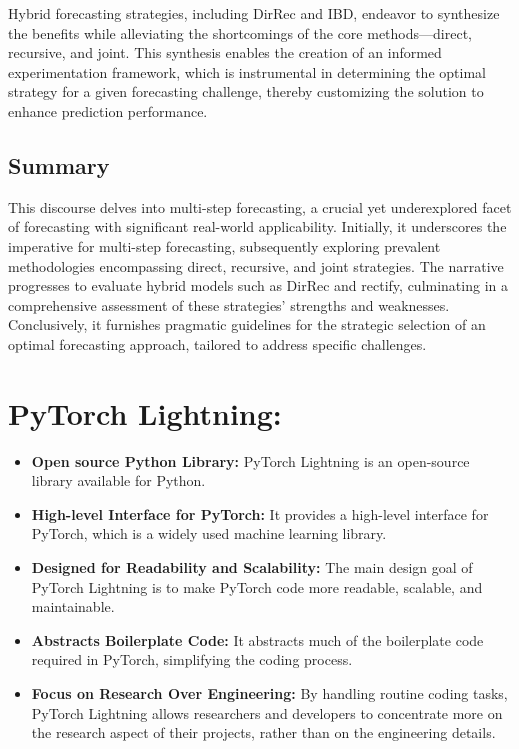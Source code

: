 \documentclass{article}
\begin{document}
Hybrid forecasting strategies, including DirRec and IBD, endeavor to synthesize the benefits while alleviating the shortcomings of the core methods—direct, recursive, and joint. This synthesis enables the creation of an informed experimentation framework, which is instrumental in determining the optimal strategy for a given forecasting challenge, thereby customizing the solution to enhance prediction performance.


\subsection{Summary}
This discourse delves into multi-step forecasting, a crucial yet underexplored facet of forecasting with significant real-world applicability. Initially, it underscores the imperative for multi-step forecasting, subsequently exploring prevalent methodologies encompassing direct, recursive, and joint strategies. The narrative progresses to evaluate hybrid models such as DirRec and rectify, culminating in a comprehensive assessment of these strategies' strengths and weaknesses. Conclusively, it furnishes pragmatic guidelines for the strategic selection of an optimal forecasting approach, tailored to address specific challenges.

\section{PyTorch Lightning:}
\begin{itemize}[label={--}]
    \item \textbf{Open source Python Library:} PyTorch Lightning is an open-source library available for Python.
    \item \textbf{High-level Interface for PyTorch:} It provides a high-level interface for PyTorch, which is a widely used machine learning library.
    \item \textbf{Designed for Readability and Scalability:} The main design goal of PyTorch Lightning is to make PyTorch code more readable, scalable, and maintainable.
    \item \textbf{Abstracts Boilerplate Code:} It abstracts much of the boilerplate code required in PyTorch, simplifying the coding process.
    \item \textbf{Focus on Research Over Engineering:} By handling routine coding tasks, PyTorch Lightning allows researchers and developers to concentrate more on the research aspect of their projects, rather than on the engineering details.
\end{itemize}
\end{document}
